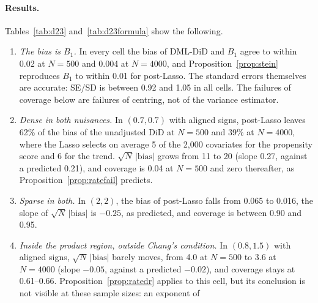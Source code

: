 \documentclass[11pt]{article}
\newenvironment{ins}{\begin{leftbar}}{\end{leftbar}}
\theoremstyle{plain}
\theoremstyle{remark}
\begin{document}
\begin{ins}

\end{ins}
\begin{table}[ht]
\centering\footnotesize
\setlength{\tabcolsep}{4pt}

\caption{D2 and D3: bias of DML-DiD, $B_1$ on the test draw, and the
approximations of Section~\ref{sec:nonsparse}. ``Formula'' is
Proposition~\ref{prop:stein} evaluated at the fitted coefficients, ``Inner'' is
\eqref{eq:inner} and ``Both omit'' is \eqref{eq:both}.}
\label{tab:d23formula}
\end{table}
\begin{ins}

\paragraph{Results.} Tables~\ref{tab:d23} and~\ref{tab:d23formula} show the
following.
\begin{enumerate}
\item \emph{The bias is $B_1$.} In every cell the bias of DML-DiD and $B_1$ agree
  to within 0.02 at $N=500$ and 0.004 at $N=4000$, and
  Proposition~\ref{prop:stein} reproduces $B_1$ to within 0.01 for post-Lasso.
  The standard errors themselves are accurate: SE/SD is between 0.92 and 1.05
  in all cells. The failures of coverage below are failures of centring, not of
  the variance estimator.
\item \emph{Dense in both nuisances.} In $(0.7,0.7)$ with aligned signs,
  post-Lasso leaves 62\% of the bias of the unadjusted DiD at $N=500$ and 39\% at
  $N=4000$, where the Lasso selects on average 5 of the 2{,}000 covariates for
  the propensity score and 6 for the trend. $\sqrt N\,|\text{bias}|$ grows from
  11 to 20 (slope 0.27, against a predicted 0.21), and coverage is 0.04 at
  $N=500$ and zero thereafter, as Proposition~\ref{prop:ratefail} predicts.
\item \emph{Sparse in both.} In $(2,2)$, the bias of post-Lasso falls from 0.065
  to 0.016, the slope of $\sqrt N\,|\text{bias}|$ is $-0.25$, as predicted, and
  coverage is between 0.90 and 0.95.
\item \emph{Inside the product region, outside Chang's condition.} In
  $(0.8,1.5)$ with aligned signs, $\sqrt N\,|\text{bias}|$ barely moves, from 4.0
  at $N=500$ to 3.6 at $N=4000$ (slope $-0.05$, against a predicted $-0.02$), and
  coverage stays at 0.61--0.66. Proposition~\ref{prop:ratedr} applies to this
  cell, but its conclusion is not visible at these sample sizes: an exponent of

\end{enumerate}
\end{ins}
\end{document}
